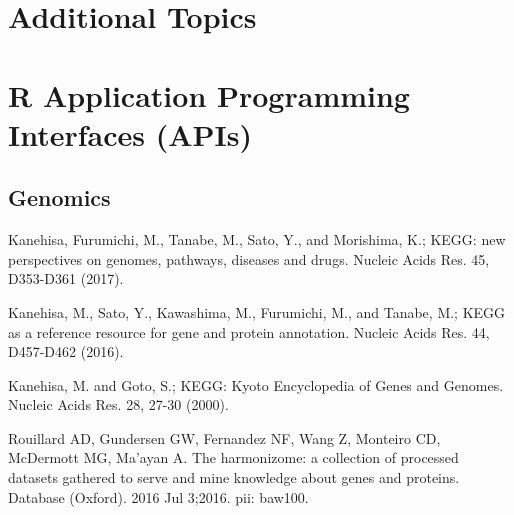 \section{Additional Topics}

\begin{enumerate}
\end{enumerate}


\section{R Application Programming Interfaces (APIs)}




\begin{thebibliography}{00}
\subsection{Genomics}

 Kanehisa, Furumichi, M., Tanabe, M., Sato, Y., and Morishima, K.; 
\newblock KEGG: new perspectives on genomes, pathways, diseases and drugs. 
\newblock Nucleic Acids Res. 45, D353-D361 (2017).

 Kanehisa, M., Sato, Y., Kawashima, M., Furumichi, M., and Tanabe, M.; 
\newblock KEGG as a reference resource for gene and protein annotation. 
\newblock Nucleic Acids Res. 44, D457-D462 (2016).

 Kanehisa, M. and Goto, S.; 
\newblock KEGG: Kyoto Encyclopedia of Genes and Genomes. 
\newblock Nucleic Acids Res. 28, 27-30 (2000). 

 Rouillard AD, Gundersen GW, Fernandez NF, Wang Z, Monteiro CD, McDermott MG, Ma'ayan A. 
\newblock The harmonizome: a collection of processed datasets gathered to serve and mine knowledge about genes and proteins. 
\newblock Database (Oxford). 2016 Jul 3;2016. pii: baw100. 

\end{thebibliography}


